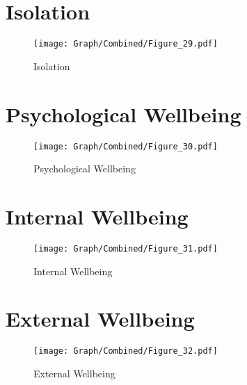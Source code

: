 \documentclass[10pt,a4paper]{article}
\begin{document}
\section{Isolation}
\begin{table}[H]\centering

\end{table}
\begin{figure}[H]\centering
\texttt{[image: Graph/Combined/Figure\_29.pdf]}
\caption{Isolation} \label{fig:Fig_29}
\end{figure}
\begin{table}[H]\centering

\end{table}
\section{Psychological Wellbeing}
\begin{table}[H]\centering

\end{table}
\begin{figure}[H]\centering
\texttt{[image: Graph/Combined/Figure\_30.pdf]}
\caption{Psychological Wellbeing} \label{fig:Fig_30}
\end{figure}
\begin{table}[H]\centering

\end{table}
\section{Internal Wellbeing}
\begin{table}[H]\centering

\end{table}
\begin{figure}[H]\centering
\texttt{[image: Graph/Combined/Figure\_31.pdf]}
\caption{Internal Wellbeing} \label{fig:Fig_31}
\end{figure}
\begin{table}[H]\centering

\end{table}
\section{External Wellbeing}
\begin{table}[H]\centering

\end{table}
\begin{figure}[H]\centering
\texttt{[image: Graph/Combined/Figure\_32.pdf]}
\caption{External Wellbeing} \label{fig:Fig_32}
\end{figure}
\begin{table}[H]\centering

\end{table}
\end{document}
